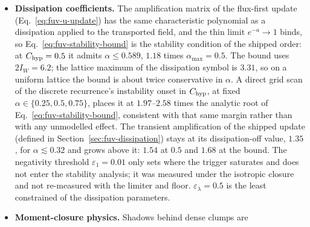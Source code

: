 \begin{itemize}
    hot/cold density-contrast fixture (a $10^6$\,K neighbour against a
    cold background) the early-transient negative-$u$ population grows
    to $323$ particles (FUV) and $456$ (LW) at snapshots $3$ to $8$,
    against at most $1$ before the dispatch moved; a smaller, standing
    negative population also appears at time-bin boundaries, where
    particles that do not share the same $c_{\rm hyp}\kappa\rho$ leave a
    residual by construction
    (Section~\ref{sec:fuv-operators}). Both are clamped to zero before
    Grackle sees them (Section~\ref{sec:fuv-coupling}); improving
    positivity at time-bin boundaries and in strongly contrasted gas,
    without changing transport in smooth fields, is open. This is a
    different mechanism from the $c_{\rm hyp}$-heterogeneity pathway of
    Section~\ref{sec:fuv-chyp-heterogeneity} (a dispatch-coverage gap
    versus a receiver-side Courant violation), and the two should not be
    conflated: fixing one does not address the other.
  \item \textbf{Dissipation coefficients.} The amplification matrix of
    the flux-first update (Eq.~\ref{eq:fuv-u-update}) has the same
    characteristic polynomial as a dissipation applied to the transported
    field, and the thin limit $e^{-a}\to1$ binds, so
    Eq.~\ref{eq:fuv-stability-bound} is the stability condition of the
    shipped order: at $C_{\rm hyp} = 0.5$ it admits $\alpha\le0.589$,
    $1.18$ times $\alpha_{\max} = 0.5$. The bound uses $2I_W = 6.2$; the
    lattice maximum of the dissipation symbol is $3.31$, so on a uniform
    lattice the bound is about twice conservative in $\alpha$. A direct
    grid scan of the discrete recurrence's instability onset in
    $C_{\rm hyp}$, at fixed $\alpha \in \{0.25, 0.5, 0.75\}$, places it
    at $1.97$--$2.58$ times the analytic root of
    Eq.~\ref{eq:fuv-stability-bound}, consistent with that same margin
    rather than with any unmodelled effect. The transient
    amplification of the shipped update (defined in
    Section~\ref{sec:fuv-dissipation}) stays at its dissipation-off value,
    $1.35$, for $\alpha\lesssim0.32$ and grows above it: $1.54$ at $0.5$ and
    $1.68$ at the bound. The
    negativity threshold $\varepsilon_1 = 0.01$ only sets where the
    trigger saturates and does not enter the stability analysis; it was
    measured under the isotropic closure and not re-measured with the
    limiter and floor. $\varepsilon_\lambda = 0.5$ is the least
    constrained of the dissipation parameters.
  \item \textbf{Moment-closure physics.} Shadows behind dense clumps are

\end{itemize}
